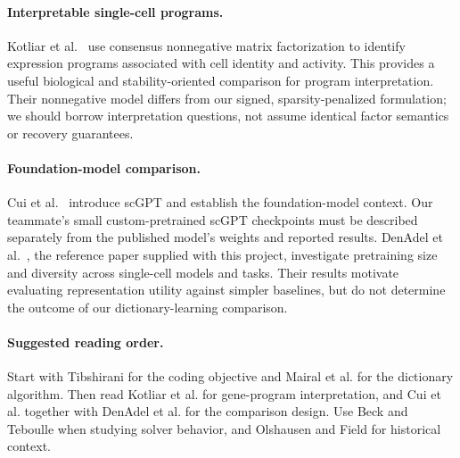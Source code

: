 \documentclass[11pt]{article}
\begin{document}
\paragraph{Interpretable single-cell programs.}
Kotliar et al.~\cite{kotliar2019} use consensus nonnegative matrix factorization to identify expression programs associated with cell identity and activity. This provides a useful biological and stability-oriented comparison for program interpretation. Their nonnegative model differs from our signed, sparsity-penalized formulation; we should borrow interpretation questions, not assume identical factor semantics or recovery guarantees.

\paragraph{Foundation-model comparison.}
Cui et al.~\cite{cui2024} introduce scGPT and establish the foundation-model context. Our teammate's small custom-pretrained scGPT checkpoints must be described separately from the published model's weights and reported results. DenAdel et al.~\cite{denadel2026}, the reference paper supplied with this project, investigate pretraining size and diversity across single-cell models and tasks. Their results motivate evaluating representation utility against simpler baselines, but do not determine the outcome of our dictionary-learning comparison.

\paragraph{Suggested reading order.}
Start with Tibshirani for the coding objective and Mairal et al. for the dictionary algorithm. Then read Kotliar et al. for gene-program interpretation, and Cui et al. together with DenAdel et al. for the comparison design. Use Beck and Teboulle when studying solver behavior, and Olshausen and Field for historical context.
\end{document}
